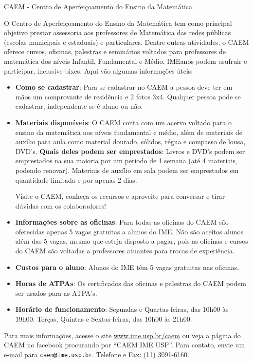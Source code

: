 \begin{secao}{CAEM - Centro de Aperfeiçoamento do Ensino da Matemática}

O Centro de Aperfeiçoamento do Ensino da Matemática tem como principal
objetivo prestar assessoria aos professores de Matemática das redes
públicas (escolas municipais e estaduais) e particulares. Dentre
outras atividades, o CAEM oferece cursos, oficinas, palestras e
seminários voltados para professores de matemática dos níveis
Infantil, Fundamental e Médio. IMEanos podem usufruir e participar,
inclusive bixes. Aqui vão algumas informações úteis:


\begin{itemize}

\item \textbf{Como se cadastrar}: Para se cadastrar no CAEM a pessoa
  deve ter em mãos um comprovante de residência e 2 fotos
  3x4. Qualquer pessoa pode se cadastrar, independente se é aluno ou
  não.

\item \textbf{Materiais disponíveis}: O CAEM conta com um acervo
  voltado para o ensino da matemática nos níveis fundamental e médio,
  além de materiais de auxílio para aula como material dourado,
  sólidos, régua e compasso de lousa, DVD's. \textbf{Quais deles podem
    ser emprestados}: Livros e DVD's podem ser emprestados na sua
  maioria por um período de 1 semana (até 4 materiais, podendo
  renovar). Materiais de auxílio em sala podem ser emprestados em
  quantidade limitada e por apenas 2 dias. 
  
  Visite o CAEM, conheça os recursos e aproveite para conversar e
  tirar dúvidas com os colaboradores!   

\item \textbf{Informações sobre as oficinas}: Para todas as oficinas
  do CAEM são oferecidas apenas 5 vagas gratuitas a alunos do IME. Não
  são aceitos alunos além das 5 vagas, mesmo que esteja disposto a
  pagar, pois as oficinas e cursos do CAEM são voltadas a professores
  atuantes para trocas de experiência.

\item \textbf{Custos para o aluno}: Alunos do IME têm 5 vagas
  gratuitas nas oficinas.

\item \textbf{Horas de ATPAs}: Os certificados das oficinas e palestras
 do CAEM podem ser usados para as ATPA's.

\item \textbf{Horário de funcionamento}: Segundas e Quartas-feiras,
  das 10h00 às 19h00. Terças, Quintas e Sextas-feiras, das 10h00 às
  21h00.
\end{itemize}

Para mais informações, acesse o site \url{www.ime.usp.br/caem} ou veja
a página do CAEM no facebook procurando por ``CAEM IME USP''. Para
contato, envie um e-mail para {\tt caem@ime.usp.br}. Telefone e Fax:
(11) 3091-6160.


\end{secao}
